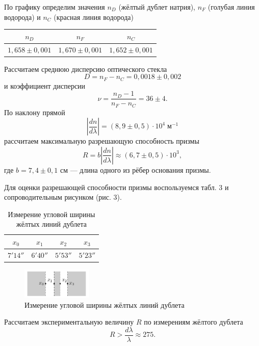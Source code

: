 \documentclass[a4paper]{article}
\begin{document}
\noindent По графику определим значения $n_D$ (жёлтый дублет натрия), $n_F$ (голубая линия водорода) и $n_C$ (красная линия водорода)

\begin{table}[!ht]
    \centering
    \begin{tabular}{|c|c|c|}
    \hline
    $n_D$  & $n_F$  & $n_C$  \\ \hline
    $1,658 \pm 0,001$ & $1,670 \pm 0,001$ & $1,652 \pm 0,001$ \\ \hline
    \end{tabular}
    \end{table}

\noindent Рассчитаем среднюю дисперсию оптического стекла $$D = n_F - n_C = 0,0018 \pm 0,002$$ и коэффициент дисперсии $$\nu = \frac{n_D - 1}{n_F - n_C} = 36 \pm 4.$$ По наклону прямой $$\left\lvert\frac{dn}{d\lambda}\right\rvert = (8,9 \pm 0,5)\cdot 10^{4} \;\text{м}^{-1}$$ рассчитаем максимальную разрешающую способность призмы $$R = b\left\lvert\frac{dn}{d\lambda}\right\rvert \approx (6,7 \pm 0,5)\cdot 10^3,$$ где $b = 7,4 \pm 0,1$ см --- длина одного из рёбер основания призмы.

\noindent Для оценки разрешающей способности призмы воспользуемся табл. 3 и сопроводительным рисунком (рис. 3).

\begin{table}[!ht]
    \centering
    \caption{Измерение угловой ширины жёлтых линий дублета}
    \begin{tabular}{|c|c|c|c|}
    \hline
    $x_0$     & $x_1$    & $x_2$    & $x_3$    \\ \hline
    $7' 14''$ & $6'40''$ & $5'53''$ & $5'23''$ \\ \hline
    \end{tabular}
    \end{table}

\begin{figure}[ht!]
    \centering
    \includegraphics[width = 0.3\textwidth]{image/pic2.png}
    \caption{Измерение угловой ширины жёлтых линий дублета}
\end{figure}

\noindent Рассчитаем экспериментальную величину $R$ по измерениям жёлтого дублета $$R > \frac{d\lambda}{\lambda} \approx 275.$$
\end{document}

